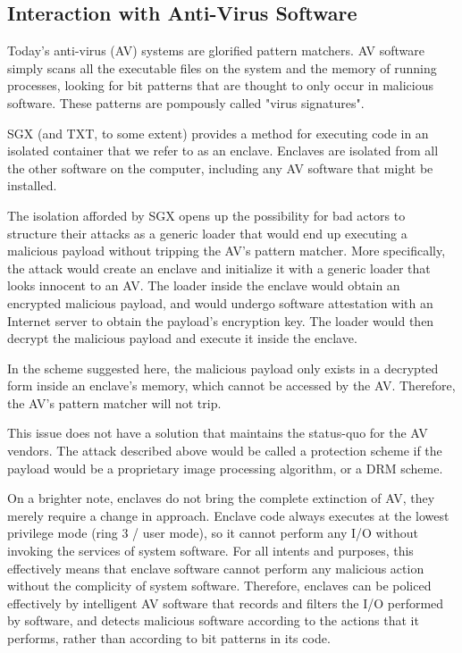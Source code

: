 \subsection{Interaction with Anti-Virus Software}

Today's anti-virus (AV) systems are glorified pattern matchers. AV software
simply scans all the executable files on the system and the memory of running
processes, looking for bit patterns that are thought to only occur in malicious
software. These patterns are pompously called "virus signatures".

SGX (and TXT, to some extent) provides a method for executing code in an
isolated container that we refer to as an enclave. Enclaves are isolated from
all the other software on the computer, including any AV software that might be
installed.

The isolation afforded by SGX opens up the possibility for bad actors to
structure their attacks as a generic loader that would end up executing a
malicious payload without tripping the AV's pattern matcher.  More
specifically, the attack would create an enclave and initialize it with a
generic loader that looks innocent to an AV. The loader inside the enclave
would obtain an encrypted malicious payload, and would undergo software
attestation with an Internet server to obtain the payload's encryption key. The
loader would then decrypt the malicious payload and execute it inside the
enclave.

In the scheme suggested here, the malicious payload only exists in a decrypted
form inside an enclave's memory, which cannot be accessed by the AV. Therefore,
the AV's pattern matcher will not trip.

This issue does not have a solution that maintains the status-quo for the AV
vendors. The attack described above would be called a protection scheme if the
payload would be a proprietary image processing algorithm, or a DRM scheme.

On a brighter note, enclaves do not bring the complete extinction of AV, they
merely require a change in approach. Enclave code always executes at the lowest
privilege mode (ring 3 / user mode), so it cannot perform any I/O without
invoking the services of system software. For all intents and purposes, this
effectively means that enclave software cannot perform any malicious action
without the complicity of system software. Therefore, enclaves can be policed
effectively by intelligent AV software that records and filters the I/O
performed by software, and detects malicious software according to the actions
that it performs, rather than according to bit patterns in its code.

